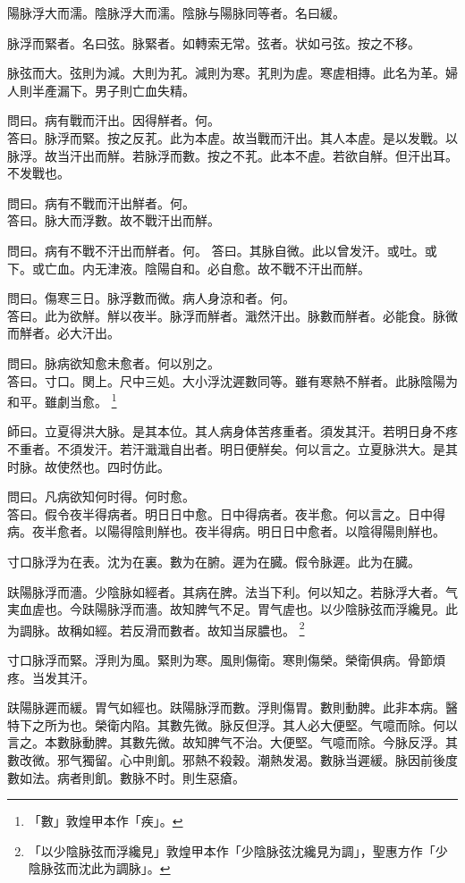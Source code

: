 \documentclass[12pt,twoside,UTF8,b5paper]{ctexbook}
\begin{document}
陽脉浮大而濡。陰脉浮大而濡。陰脉与陽脉同等者。名曰緩。

脉浮而緊者。名曰弦。脉緊者。如轉索无常。弦者。状如弓弦。按之不移。

脉弦而大。弦則为減。大則为芤。減則为寒。芤則为虗。寒虗相摶。此名为革。婦人則半產漏下。男子則亡血失精。

問曰。病有戰而汗出。因得觧者。何。\\
答曰。脉浮而緊。按之反芤。此为本虗。故当戰而汗出。其人本虗。是以发戰。以脉浮。故当汗出而觧。若脉浮而數。按之不芤。此本不虗。若欲自觧。但汗出耳。不发戰也。

問曰。病有不戰而汗出觧者。何。\\
答曰。脉大而浮數。故不戰汗出而觧。

問曰。病有不戰不汗出而觧者。何。
答曰。其脉自微。此以曾发汗。或吐。或下。或亡血。内无津液。陰陽自和。必自愈。故不戰不汗出而觧。

問曰。傷寒三日。脉浮數而微。病人身涼和者。何。\\
答曰。此为欲觧。觧以夜半。脉浮而觧者。濈然汗出。脉數而觧者。必能食。脉微而觧者。必大汗出。

問曰。脉病欲知愈未愈者。何以別之。\\
答曰。寸口。関上。尺中三処。大小浮沈遲數同等。雖有寒熱不觧者。此脉陰陽为和平。雖劇当愈。
	\footnote{「數」敦煌甲本作「疾」。}

師曰。立夏得洪大脉。是其本位。其人病身体苦疼重者。須发其汗。若明日身不疼不重者。不須发汗。若汗濈濈自出者。明日便觧矣。何以言之。立夏脉洪大。是其时脉。故使然也。四时仿此。

問曰。凡病欲知何时得。何时愈。\\
答曰。假令夜半得病者。明日日中愈。日中得病者。夜半愈。何以言之。日中得病。夜半愈者。以陽得陰則觧也。夜半得病。明日日中愈者。以陰得陽則觧也。

寸口脉浮为在表。沈为在裏。數为在腑。遲为在臓。假令脉遲。此为在臓。

趺陽脉浮而濇。少陰脉如經者。其病在脾。法当下利。何以知之。若脉浮大者。气実血虗也。今趺陽脉浮而濇。故知脾气不足。胃气虗也。以少陰脉弦而浮纔見。此为調脉。故稱如經。若反滑而數者。故知当尿膿也。
	\footnote{「以少陰脉弦而浮纔見」敦煌甲本作「少陰脉弦沈纔見为調」，聖惠方作「少陰脉弦而沈此为調脉」。}

寸口脉浮而緊。浮則为風。緊則为寒。風則傷衛。寒則傷榮。榮衛俱病。骨節煩疼。当发其汗。

趺陽脉遲而緩。胃气如經也。趺陽脉浮而數。浮則傷胃。數則動脾。此非本病。醫特下之所为也。榮衛内陷。其數先微。脉反但浮。其人必大便堅。气噫而除。何以言之。本數脉動脾。其數先微。故知脾气不治。大便堅。气噫而除。今脉反浮。其數改微。邪气獨留。心中則飢。邪熱不殺穀。潮熱发渴。數脉当遲緩。脉因前後度數如法。病者則飢。數脉不时。則生惡瘡。
\end{document}
